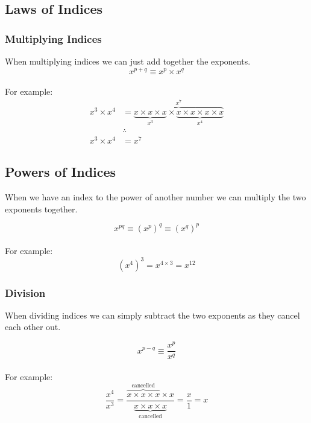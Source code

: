 \documentclass[a4paper]{article}
\begin{document}
\subsection{Laws of Indices}

\subsubsection{Multiplying Indices}

When multiplying indices we can just add together the exponents.
\begin{equation}
	x^{p + q} \equiv x^{p} \times x^{q}
\end{equation}
\\
For example:
\begin{align*}
	x^3 \times x^4 &= \overbrace{
		\underbrace{x \times x \times x}_{x^3} \times
		\underbrace{x \times x \times x \times x}_{x^4}}^{x^7}\\
	&\therefore\\
	x^3 \times x^4 &= x^7
\end{align*}

\subsection{Powers of Indices}
When we have an index to the power of another number we can multiply the two exponents together.

\begin{equation}
	x^{pq} \equiv (x^{p})^{q} \equiv (x^{q})^{p} 
\end{equation}
\\
For example:
\begin{equation}
	(x^4)^3 = x^{4 \times 3} = x^{12}
\end{equation}


\subsubsection{Division}
When dividing indices we can simply subtract the two exponents as they cancel each other out.

\begin{equation}
	x^{p - q} \equiv \frac{x^{p}}{x^{q}}
\end{equation}
\\
For example:
\begin{equation}
	\frac{x^4}{x^3} = \frac
		{\overbrace{x \times x \times x}^\text{cancelled} \times x}
		{\underbrace{x \times x \times x}_\text{cancelled}}
		= \frac{x}{1} = x
\end{equation}
\end{document}
